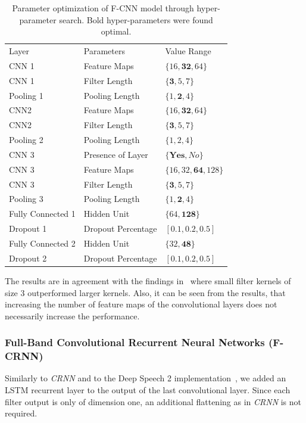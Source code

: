 \begin{table}
  \centering
  \scriptsize
\begin{tabular}{lll}
  \toprule
  Layer               & Parameters        & Value Range \\
  CNN 1               & Feature Maps      & \( \{16, \mathbf{32}, 64\} \) \\
  CNN 1               & Filter Length     & \( \{\mathbf{3}, 5, 7\} \) \\
  Pooling 1           & Pooling Length    & \( \{1, \mathbf{2}, 4\} \) \\
  CNN2                & Feature Maps      & \( \{16, \mathbf{32}, 64\} \) \\
  CNN2                & Filter Length     & \( \{\mathbf{3}, 5, 7\} \) \\
  Pooling 2           & Pooling Length    & \( \{1, 2, 4\} \) \\
  \midrule
  CNN 3               & Presence of Layer & \( \{\mathbf{Yes}, No\} \) \\
  CNN 3               & Feature Maps      & \( \{16, 32, \mathbf{64}, 128\} \) \\
  CNN 3               & Filter Length     & \( \{\mathbf{3}, 5, 7\} \) \\
  Pooling 3           & Pooling Length    & \( \{1, \mathbf{2}, 4\} \) \\
  \midrule
  Fully Connected 1   & Hidden Unit       & \( \{64, \mathbf{128}\} \) \\
  Dropout 1           & Dropout Percentage& \( [0.1, \mathbf{0.2}, 0.5] \) \\
  Fully Connected 2   & Hidden Unit       & \( \{32, \mathbf{48}\} \) \\
  Dropout 2           & Dropout Percentage& \( [0.1, \mathbf{0.2}, 0.5] \) \\
  \bottomrule
  \end{tabular}
    \caption{Parameter optimization of F-CNN model through hyper-parameter search. Bold hyper-parameters were found optimal.}%
  \label{tab:fcnnhyper}
\end{table}

The results are in agreement with the findings in~\cite{schluter16} where small filter kernels of size 3 outperformed larger kernels. Also, it can be seen from the results, that increasing the number of feature maps of the convolutional layers does not necessarily increase the performance.

\subsubsection{Full-Band Convolutional Recurrent Neural Networks (F-CRNN)}%
Similarly to \emph{CRNN} and to the Deep Speech 2 implementation~\cite{amodei16}, we added an LSTM recurrent layer to the output of the last convolutional layer.
Since each filter output is only of dimension one, an additional flattening as in \emph{CRNN} is not required.

